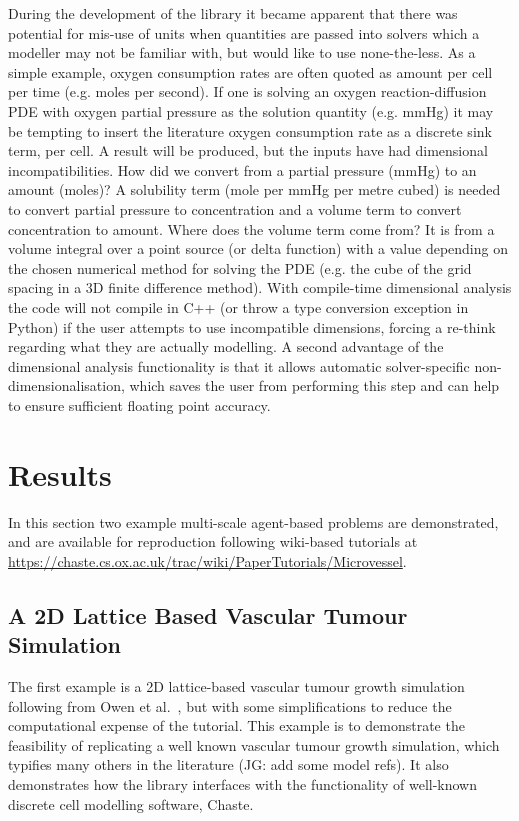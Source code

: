 \documentclass[10pt,letterpaper]{article}
\begin{document}
During the development of the library it became apparent that there was potential for mis-use of units when quantities are passed into solvers which a modeller may not be familiar with, but would like to use none-the-less. As a simple example, oxygen consumption rates are often quoted as amount per cell per time (e.g. moles per second). If one is solving an oxygen reaction-diffusion PDE with oxygen partial pressure as the solution quantity (e.g. mmHg) it may be tempting to insert the literature oxygen consumption rate as a discrete sink term, per cell. A result will be produced, but the inputs have had dimensional incompatibilities. How did we convert from a partial pressure (mmHg) to an amount (moles)? A solubility term (mole per mmHg per metre cubed) is needed to convert partial pressure to concentration and a volume term to convert concentration to amount. Where does the volume term come from? It is from a volume integral over a point source (or delta function) with a value depending on the chosen numerical method for solving the PDE (e.g. the cube of the grid spacing in a 3D finite difference method). With compile-time dimensional analysis the code will not compile in C++ (or throw a type conversion exception in Python) if the user attempts to use incompatible dimensions, forcing a re-think regarding what they are actually modelling. A second advantage of the dimensional analysis functionality is that it allows automatic solver-specific non-dimensionalisation, which saves the user from performing this step and can help to ensure sufficient floating point accuracy.

\section*{Results}

In this section two example multi-scale agent-based problems are demonstrated, and are available for reproduction following wiki-based tutorials at \url{https://chaste.cs.ox.ac.uk/trac/wiki/PaperTutorials/Microvessel}.

\subsection*{A 2D Lattice Based Vascular Tumour Simulation}

The first example is a 2D lattice-based vascular tumour growth simulation following from Owen et al.~\cite{Owen2011}, but with some simplifications to reduce the computational expense of the tutorial. This example is to demonstrate the feasibility of replicating a well known vascular tumour growth simulation, which typifies many others in the literature (JG: add some model refs). It also demonstrates how the library interfaces with the functionality of well-known discrete cell modelling software, Chaste.
\end{document}
